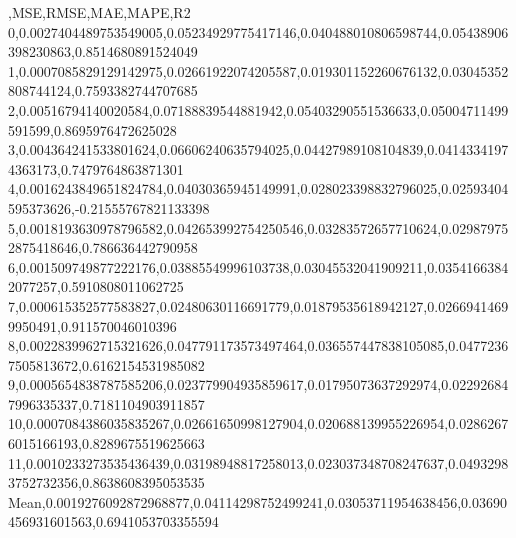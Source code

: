 ,MSE,RMSE,MAE,MAPE,R2
0,0.0027404489753549005,0.05234929775417146,0.040488010806598744,0.05438906398230863,0.8514680891524049
1,0.0007085829129142975,0.02661922074205587,0.019301152260676132,0.03045352808744124,0.7593382744707685
2,0.00516794140020584,0.07188839544881942,0.05403290551536633,0.05004711499591599,0.8695976472625028
3,0.004364241533801624,0.06606240635794025,0.04427989108104839,0.04143341974363173,0.7479764863871301
4,0.0016243849651824784,0.04030365945149991,0.028023398832796025,0.02593404595373626,-0.21555767821133398
5,0.0018193630978796582,0.042653992754250546,0.03283572657710624,0.029879752875418646,0.786636442790958
6,0.001509749877222176,0.03885549996103738,0.03045532041909211,0.03541663842077257,0.5910808011062725
7,0.000615352577583827,0.02480630116691779,0.01879535618942127,0.02669414699950491,0.911570046010396
8,0.0022839962715321626,0.047791173573497464,0.036557447838105085,0.04772367505813672,0.6162154531985082
9,0.0005654838787585206,0.023779904935859617,0.01795073637292974,0.022926847996335337,0.7181104903911857
10,0.0007084386035835267,0.02661650998127904,0.020688139955226954,0.02862676015166193,0.8289675519625663
11,0.0010233273535436439,0.03198948817258013,0.023037348708247637,0.04932983752732356,0.8638608395053535
Mean,0.0019276092872968877,0.04114298752499241,0.03053711954638456,0.03690456931601563,0.6941053703355594
